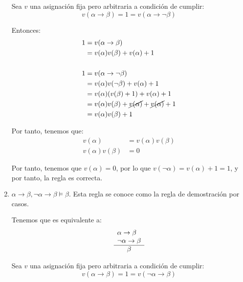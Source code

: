 \begin{ejercicio*}
\begin{enumerate}
        Sea $v$ una asignación fija pero arbitraria a condición de cumplir:
        \begin{equation*}
            v(\alpha\rightarrow\beta)=1=v(\alpha\rightarrow\lnot\beta)
        \end{equation*}

        Entonces:
        \begin{align*}
            1 &= v(\alpha\rightarrow\beta)\\
            &= v(\alpha)v(\beta)+v(\alpha)+1\\ \\
            1 &= v(\alpha\rightarrow\lnot\beta)\\
            &= v(\alpha)v(\lnot\beta)+v(\alpha)+1\\
            &= v(\alpha)(v(\beta)+1)+v(\alpha)+1\\
            &= v(\alpha)v(\beta)+\cancel{v(\alpha)}+\cancel{v(\alpha)}+1\\
            &= v(\alpha)v(\beta)+1
        \end{align*}

        Por tanto, tenemos que:
        \begin{align*}
            v(\alpha)&= v(\alpha)v(\beta)\\
            v(\alpha)v(\beta)&= 0
        \end{align*}

        Por tanto, tenemos que $v(\alpha)=0$, por lo que
        $v(\lnot\alpha)=v(\alpha)+1=1$, y por tanto, la regla es correcta.

        \item $\alpha\rightarrow\beta,\lnot\alpha\rightarrow\beta\models\beta$. Esta regla se conoce como la regla de demostración por casos.
        
        Tenemos que es equivalente a:
        \begin{equation*}
            \begin{array}{l}
                \alpha\rightarrow\beta\\
                \lnot\alpha\rightarrow\beta\\ \hline
                \multicolumn{1}{c}{\beta}
            \end{array}
        \end{equation*}

        Sea $v$ una asignación fija pero arbitraria a condición de cumplir:
        \begin{equation*}
            v(\alpha\rightarrow\beta)=1=v(\lnot\alpha\rightarrow\beta)
        \end{equation*}


\end{enumerate}
\end{ejercicio*}
